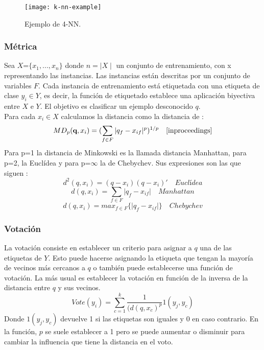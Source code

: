 \begin{figure}[H]
  \centering
  \texttt{[image: k-nn-example]}
  \caption{Ejemplo de 4-NN.}
  \label{fig:k-nn-example}
\end{figure}
\begin{center}
\cite{peterson2009k}
\end{center}

\subsubsection{Métrica}
Sea $X$=$\lbrace x_{1},...,x_{n} \rbrace$ donde $n=\mid X \mid$ un conjunto de entrenamiento, con x representando las instancias. Las instancias están descritas por un conjunto de variables $F$. Cada instancia de entrenamiento está etiquetada con una etiqueta de clase $y_{i} \in Y$, es decir, la función de etiquetado establece una aplicación biyectiva entre $X$ e $Y$. El objetivo es clasificar un ejemplo desconocido \textbf{$q$}.\cite{padraiddelany2007k}\\
Para cada $x_{i} \in X$ calculamos la distancia como la distancia de :
\[ MD_{p}(\textbf{q},x_{i})= (\sum_{f \in F}  \vert q_{f} - x_{if} \vert ^{p})^{1/p} \quad \cite{inproceedings} \] 
Para p=1 la distancia de Minkowski es la llamada distancia Manhattan, para p=2, la Euclídea y para p=$\infty$ la de Chebychev. Sus expresiones son las que siguen \cite{inproceedings}:
\[ d^{2}(q,x_{i})= (q-x_{i})(q-x_{i})' \quad Euclídea \]
\[ d(q,x_{i})=\sum_{f \in F}  \vert q_{f} - x_{if} \vert \quad  Manhattan \]
\[ d(q,x_{i})=max_{f \in F} \lbrace \vert q_{f} - x_{if} \vert \rbrace \quad Chebychev \]

\subsubsection{Votación}
La votación consiste en establecer un criterio para asignar a $q$ una de las etiquetas de $Y$. Esto puede hacerse asignando la etiqueta que tengan la mayoría de vecinos más cercanos a $q$ o también puede establecerse una función de votación. La más usual es establecer la votación en función de la inversa de la distancia entre $q$ y sus vecinos. 
\[ Vote(y_{i}) = \sum^{k}_{c=1} \frac{1}{(d(q,x_{c})^{p}} 1(y_{j},y_{c}) \]
Donde $1(y_{j},y_{c})$ devuelve 1 si las etiquetas son iguales y 0 en caso contrario. En la función, $p$ se suele establecer a 1 pero se puede aumentar o disminuir para cambiar la influencia que tiene la distancia en el voto. \cite{padraiddelany2007k}

